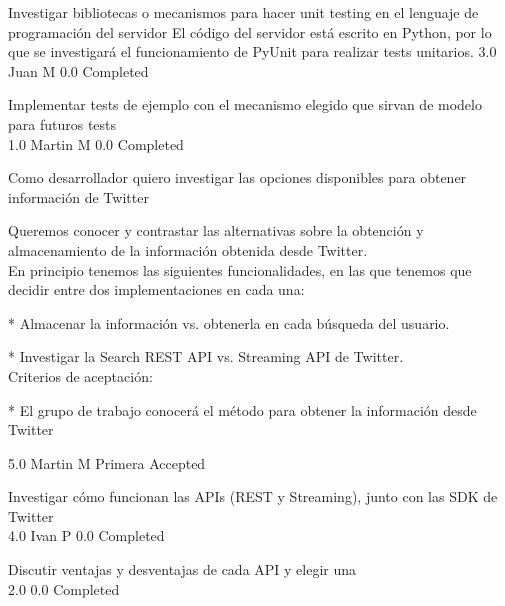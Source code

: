 		{Investigar bibliotecas o mecanismos para hacer unit testing en el lenguaje de programación del servidor} %
		{El código del servidor está escrito en Python, por lo que se investigará el
funcionamiento de PyUnit para realizar tests unitarios.} %
		{3.0} %
		{Juan M} %
		{0.0} %
		{Completed} %

		{Implementar tests de ejemplo con el mecanismo elegido que sirvan de modelo para futuros tests} %
		{\\
} %
		{1.0} %
		{Martin M} %
		{0.0} %
		{Completed} %


\vspace{20pt}

	{Como desarrollador quiero investigar las opciones disponibles para obtener información de Twitter} %
	{Queremos conocer y contrastar las alternativas sobre la obtención y
almacenamiento de la información obtenida desde Twitter.
  \\
En principio tenemos las siguientes funcionalidades, en las que tenemos que
decidir entre dos implementaciones en cada una:

* Almacenar la información vs. obtenerla en cada búsqueda del usuario.

* Investigar la Search REST API vs. Streaming API de Twitter.
  \\
Criterios de aceptación:

* El grupo de trabajo conocerá el método para obtener la información desde Twitter  
} %
	{} %
	{5.0} %
	{Martin M} %
	{Primera} %
	{Accepted} %

		{Investigar cómo funcionan las APIs (REST y Streaming), junto con las SDK de Twitter} %
		{\\
} %
		{4.0} %
		{Ivan P} %
		{0.0} %
		{Completed} %

		{Discutir ventajas y desventajas de cada API y elegir una} %
		{\\
} %
		{2.0} %
		{} %
		{0.0} %
		{Completed} %

